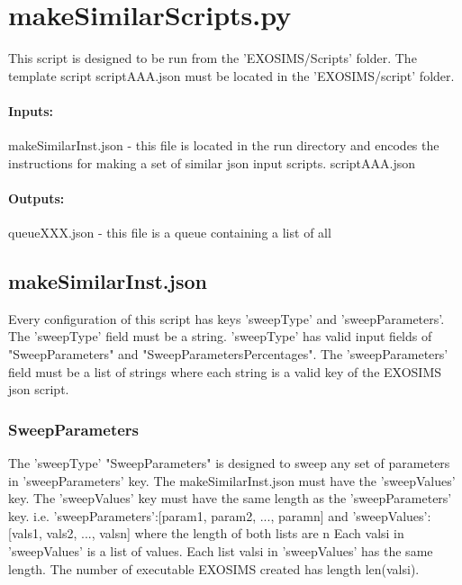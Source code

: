 \documentclass[12pt]{article}
\begin{document}
\maketitle


\section{makeSimilarScripts.py}
This script is designed to be run from the 'EXOSIMS/Scripts' folder.
The template script scriptAAA.json must be located in the 'EXOSIMS/script' folder.
\paragraph{Inputs:}
makeSimilarInst.json - this file is located in the run directory and encodes the instructions for making a set of similar json input scripts.
scriptAAA.json
\paragraph{Outputs:}
queueXXX.json - this file is a queue containing a list of all

\subsection{makeSimilarInst.json}
Every configuration of this script has keys
'sweepType' and 'sweepParameters'.
The 'sweepType' field must be a string.
'sweepType' has valid input fields of "SweepParameters" and "SweepParametersPercentages".
The 'sweepParameters' field must be a list of strings where each string is a valid key of the EXOSIMS json script.

\subsubsection{SweepParameters}
The 'sweepType' "SweepParameters" is designed to sweep any set of parameters in 'sweepParameters' key.
The makeSimilarInst.json must have the 'sweepValues' key.
The 'sweepValues' key must have the same length as the 'sweepParameters' key.
i.e. 'sweepParameters':[param1, param2, ..., paramn] and 'sweepValues':[vals1, vals2, ..., valsn] where the length of both lists are n
Each valsi in 'sweepValues' is a list of values.
Each list valsi in 'sweepValues' has the same length.
The number of executable EXOSIMS created has length len(valsi).
\end{document}
